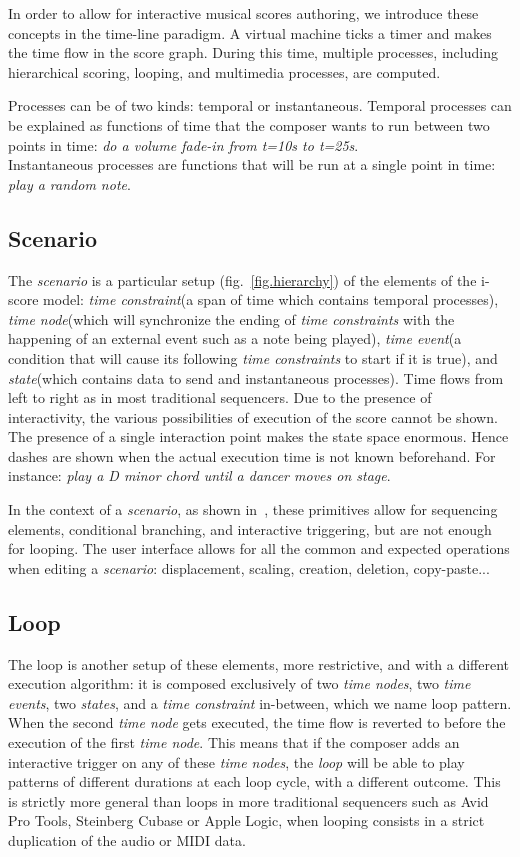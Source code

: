 \documentclass{article}
\newcommand{\scenario}{\textit{scenario}\xspace}
\newcommand{\Loop}{\textit{loop}\xspace}
\newcommand{\state}{\textit{state}\xspace}
\newcommand{\states}{\textit{states}\xspace}
\newcommand{\timeevent}{\textit{time event}\xspace}
\newcommand{\timeevents}{\textit{time events}\xspace}
\newcommand{\timenode}{\textit{time node}\xspace}
\newcommand{\timenodes}{\textit{time nodes}\xspace}
\newcommand{\timeconstraint}{\textit{time constraint}\xspace}
\newcommand{\timeconstraints}{\textit{time constraints}\xspace}
\begin{document}
In order to allow for interactive musical scores authoring, we introduce these concepts in the time-line paradigm.
A virtual machine ticks a timer and makes the time flow in the score graph. 
During this time, multiple processes, including hierarchical scoring, looping, and multimedia processes, are computed.

Processes can be of two kinds: temporal or instantaneous.
Temporal processes can be explained as functions of time that the composer wants to run between 
two points in time: \emph{do a volume fade-in from t=10s to t=25s}.~\\
Instantaneous processes are functions that will be run at a single point in time: \emph{play a random note}.

\subsection{Scenario}
The \scenario is a particular setup (fig.~\ref{fig.hierarchy}) of the elements of the i-score model: \timeconstraint (a span of time which contains temporal processes), \timenode (which will synchronize the ending of \timeconstraints with the happening of an external event such as a note being played), \timeevent (a condition that will cause its following \timeconstraints to start if it is true), and \state (which contains data to send and instantaneous processes).
Time flows from left to right as in most traditional sequencers. 
Due to the presence of interactivity, the various possibilities of execution of the score cannot be shown. 
The presence of a single interaction point makes the state space enormous.
Hence dashes are shown when the actual execution time is not known beforehand. 
For instance: \emph{play a D minor chord until a dancer moves on stage}.

In the context of a \scenario, as shown in~\cite{celerier2015ossia}, these primitives allow for sequencing elements, conditional branching, and interactive triggering, but are not enough for looping.
The user interface allows for all the common and expected operations when editing a \scenario: displacement, scaling, creation, deletion, copy-paste...

\subsection{Loop}
The loop is another setup of these elements, more restrictive, and with a different execution algorithm: it is 
composed exclusively of two \timenodes, two \timeevents, two \states, and a \timeconstraint in-between, which we name loop pattern.
When the second \timenode gets executed, the time flow is reverted to before the execution of the first \timenode.
This means that if the composer adds an interactive trigger on any of these \timenodes, the \Loop will be able to play patterns of different durations at each loop cycle, with a different outcome.
This is strictly more general than loops in more traditional sequencers such as Avid Pro Tools, Steinberg Cubase or Apple Logic, when looping consists in a strict duplication of the audio or MIDI data.
\end{document}

